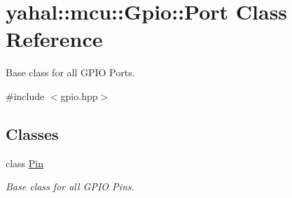 \hypertarget{classyahal_1_1mcu_1_1_gpio_1_1_port}{}\section{yahal\+:\+:mcu\+:\+:Gpio\+:\+:Port Class Reference}
\label{classyahal_1_1mcu_1_1_gpio_1_1_port}


Base class for all G\+P\+I\+O Ports.  




{\ttfamily \#include $<$gpio.\+hpp$>$}

\subsection*{Classes}
\begin{DoxyCompactItemize}
\item 
class \hyperlink{classyahal_1_1mcu_1_1_gpio_1_1_port_1_1_pin}{Pin}
\begin{DoxyCompactList}\small\item\em Base class for all G\+P\+I\+O Pins. \end{DoxyCompactList}\end{DoxyCompactItemize}
